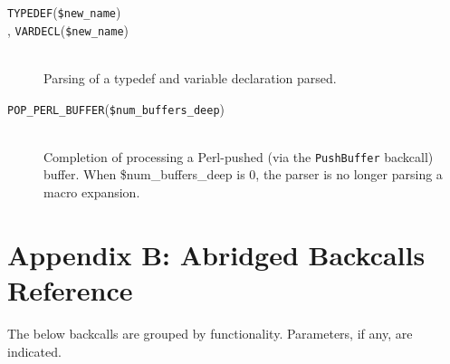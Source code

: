 \documentclass{article}
\newcommand{\Perl}{\mbox{Perl}}
\newcommand{\hook}[2]{\texttt{#1}(\texttt{#2}) \\ }
\newcommand{\shook}[1]{\texttt{#1}}
\begin{document}
\begin{description}

\item[\hook{TYPEDEF}{\$new\_\-name}, \hook{VARDECL}{\$new\_\-name}] ~ \\
  Parsing of a typedef and variable declaration parsed.

\item[\hook{POP\_PERL\_BUFFER}{\$num\_\-buffers\_\-deep}] ~ \\
  Completion of processing a \Perl{}-pushed (via the \texttt{PushBuffer}
  backcall) buffer.  When \$num\_\-buffers\_\-deep is 0, the parser is no 
  longer parsing a macro expansion.

\end{description}

\section*{Appendix B: Abridged Backcalls Reference}
\label{sec:backcalls}

The below backcalls are grouped by functionality.  Parameters, if any,
are indicated.
\end{document}
